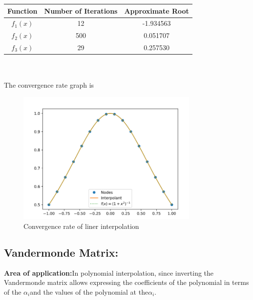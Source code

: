 \documentclass{article}
\begin{document}
\begin{tabular}{|c|c|c|}
	\hline 
	Function &
	Number of Iterations &
	Approximate Root
	\\ 
	\hline
	
	$f_1(x)$ & 12 &  -1.934563 \\
	\hline 
	$f_2(x)$ & 500 & 0.051707 \\
	\hline
	$f_3(x)$ & 29 & 0.257530 \\
	\hline
	
\end{tabular}\\    
	\\[0.1in]
	The convergence rate graph is
	\begin{figure}[H]
		\caption{Convergence rate of liner interpolation}
		\includegraphics[width=0.8\textwidth, height=0.6\textwidth]{linear_interpolation.png}
	\end{figure}

	\subsection{Vandermonde Matrix:}
	{\bf Area of application:}In polynomial interpolation, since inverting the Vandermonde matrix allows expressing the coefficients of the polynomial in terms of the ${\displaystyle \alpha _{i}} $and the values of the polynomial at the$ {\displaystyle \alpha _{i}.}$
	
\end{document}
